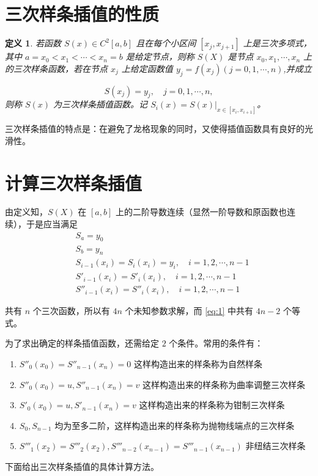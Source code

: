 \documentclass{ctexart}
\newtheorem{definition}{定义}[section]
\numberwithin{equation}{section}
\begin{document}
\section{三次样条插值的性质}



\begin{definition}
    若函数 $S(x)\in C^2[a,b]$ 且在每个小区间 $[x_j,x_{j+1}]$ 上是三次多项式，其中 $a=x_0<x_1<\cdots<x_n=b$ 是给定节点，则称 $S(X)$ 是节点 $x_0,x_1,\cdots,x_n$ 上的三次样条函数，若在节点 $x_j$ 上给定函数值 $y_j = f(x_j)(j=0,1,\cdots,n)$,并成立

    \begin{equation}
        S(x_j)=y_j,\quad j=0,1,\cdots,n,
    \end{equation}
    则称 $S(x)$ 为三次样条插值函数。记 $S_i(x)=S(x)|_{x\in [x_i,x_{i+1}]}$。
\end{definition}

三次样条插值的特点是：在避免了龙格现象的同时，又使得插值函数具有良好的光滑性。
\section{计算三次样条插值}
由定义知，$S(X)$ 在 $[a,b]$ 上的二阶导数连续（显然一阶导数和原函数也连续），于是应当满足
\begin{equation}
\begin{aligned}
     &S_{a} = y_0\\
    &S_{b} = y_n\\
    &S_{i-1}(x_i) = S_{i}(x_i) = y_i,\quad i = 1,2,\cdots,n-1\\
    &S'_{i-1}(x_i) = S'_{i}(x_i),\quad i = 1,2,\cdots,n-1\\
     &S''_{i-1}(x_i) = S''_{i}(x_i),\quad i = 1,2,\cdots,n-1
\end{aligned}
\label{eq:1}
\end{equation}

共有 $n$ 个三次函数，所以有 $4n$ 个未知参数求解，而 \eqref{eq:1} 中共有 $4n-2$ 个等式。

为了求出确定的样条插值函数，还需给定 $2$ 个条件。常用的条件有：

\begin{enumerate}
    \item $S''_0(x_0)=S''_{n-1}(x_n)=0$ 这样构造出来的样条称为自然样条
    \item $S''_0(x_0)=u,S''_{n-1}(x_n)=v$ 这样构造出来的样条称为曲率调整三次样条
    \item $S'_0(x_0)=u,S'_{n-1}(x_n)=v$ 这样构造出来的样条称为钳制三次样条
    \item $S_0,S_{n-1}$ 均为至多二阶，这样构造出来的样条称为抛物线端点的三次样条
    \item $S'''_1(x_2)=S'''_2(x_2),S'''_{n-2}(x_{n-1})=S'''_{n-1}(x_{n-1})$ 非纽结三次样条
\end{enumerate}
下面给出三次样条插值的具体计算方法。
\end{document}
